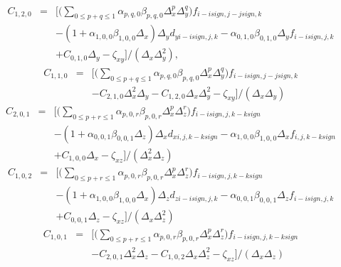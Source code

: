 \begin{eqnarray}
           C_{1,2,0}&=&{\bigg[}{\bigg(}{\sum_{\scriptstyle 0\le p+q\le 1}} \alpha_{p,q,0}\beta_{p,q,0}\Delta_x^p\Delta_y^q{\bigg)}f_{i-isign,j-jsign,k} \nonumber \\
                  & &-(1+\alpha_{1,0,0}\beta_{1,0,0}\Delta_x)\Delta_yd_{yi-isign,j,k}-\alpha_{0,1,0}\beta_{0,1,0}\Delta_yf_{i-isign,j,k} \nonumber \\
                  & &+C_{0,1,0}\Delta_y-\zeta_{xy}{\bigg]}{\big /}(\Delta_x\Delta_y^2),
\end{eqnarray}
\begin{eqnarray}
           C_{1,1,0}&=&{\bigg[}{\bigg(}{\sum_{\scriptstyle 0\le p+q\le 1}} \alpha_{p,q,0}\beta_{p,q,0}\Delta_x^p\Delta_y^q{\bigg)}f_{i-isign,j-jsign,k} \nonumber \\
                  & &-C_{2,1,0}\Delta_x^2\Delta_y-C_{1,2,0}\Delta_x\Delta_y^2-\zeta_{xy}{\bigg]}{\big /}(\Delta_x\Delta_y)
\end{eqnarray}
\begin{eqnarray}
           C_{2,0,1}&=&{\bigg[}{\bigg(}{\sum_{\scriptstyle 0\le p+r\le 1}} \alpha_{p,0,r}\beta_{p,0,r}\Delta_x^p\Delta_z^r{\bigg)}f_{i-isign,j,k-ksign} \nonumber \\
                  & &-(1+\alpha_{0,0,1}\beta_{0,0,1}\Delta_z)\Delta_xd_{xi,j,k-ksign}-\alpha_{1,0,0}\beta_{1,0,0}\Delta_xf_{i,j,k-ksign} \nonumber \\
                  & &+C_{1,0,0}\Delta_x-\zeta_{xz}{\bigg]}{\big /}(\Delta_x^2\Delta_z)
\end{eqnarray}
\begin{eqnarray}
           C_{1,0,2}&=&{\bigg[}{\bigg(}{\sum_{\scriptstyle 0\le p+r\le 1}} \alpha_{p,0,r}\beta_{p,0,r}\Delta_x^p\Delta_z^r{\bigg)}f_{i-isign,j,k-ksign} \nonumber \\
                  & &-(1+\alpha_{1,0,0}\beta_{1,0,0}\Delta_x)\Delta_zd_{zi-isign,j,k}-\alpha_{0,0,1}\beta_{0,0,1}\Delta_zf_{i-isign,j,k} \nonumber \\
                  & &+C_{0,0,1}\Delta_z-\zeta_{xz}{\bigg]}{\big /}(\Delta_x\Delta_z^2)
\end{eqnarray}
\begin{eqnarray}
           C_{1,0,1}&=&{\bigg[}{\bigg(}{\sum_{\scriptstyle 0\le p+r\le 1}} \alpha_{p,0,r}\beta_{p,0,r}\Delta_x^p\Delta_z^r{\bigg)}f_{i-isign,j,k-ksign} \nonumber \\
                  & &-C_{2,0,1}\Delta_x^2\Delta_z-C_{1,0,2}\Delta_x\Delta_z^2-\zeta_{xz}{\bigg]}{\big /}(\Delta_x\Delta_z)
\end{eqnarray}

